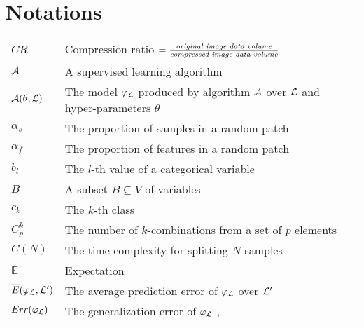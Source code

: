 \chapter{Notations}\label{sec:notations}

\begin{tabularx}{\textwidth}{ l X }
$CR$ & {Compression ratio} $= \frac{\emph{original image data volume}}{\emph{compressed image data volume}}$ \dotfill \pageref{eqn:CR} \\
${\cal A}$ & A supervised learning algorithm \dotfill  \pageref{ntn:A}\\
${\cal A}(\theta, {\cal L})$ & The model $\varphi_{\cal L}$ produced by algorithm ${\cal A}$ over ${\cal L}$ and hyper-parameters $\theta$ \dotfill  \pageref{ntn:A-func}\\
$\alpha_s$ & The proportion of samples in a random patch \dotfill  \pageref{ntn:alpha_s}\\
$\alpha_f$ & The proportion of features in a random patch \dotfill  \pageref{ntn:alpha_f}\\
$b_l$ & The $l$-th value of a categorical variable \dotfill  \pageref{ntn:b_l}\\
$B$ & A subset $B \subseteq V$ of variables \dotfill  \pageref{ntn:B}\\
$c_k$ & The $k$-th class \dotfill  \pageref{ntn:c_k}\\
$C^k_p$ & The number of $k$-combinations from a set of $p$ elements \dotfill  \pageref{ntn:C_k_p}\\
$C(N)$ & The time complexity for splitting $N$ samples \dotfill  \pageref{ntn:cN}\\
$\mathbb{E}$ & Expectation \dotfill \\
$\overline{E}(\varphi_{\cal L}, {\cal L}^\prime)$ & The average prediction error of $\varphi_{\cal L}$ over ${\cal L}^\prime$ \dotfill  \pageref{ntn:E_bar}\\
$Err(\varphi_{\cal L})$ & The generalization error of $\varphi_{\cal L}$ \dotfill  \pageref{eqn:generalization-error}, \pageref{eqn:4:generalization-error}\\
\end{tabularx}
